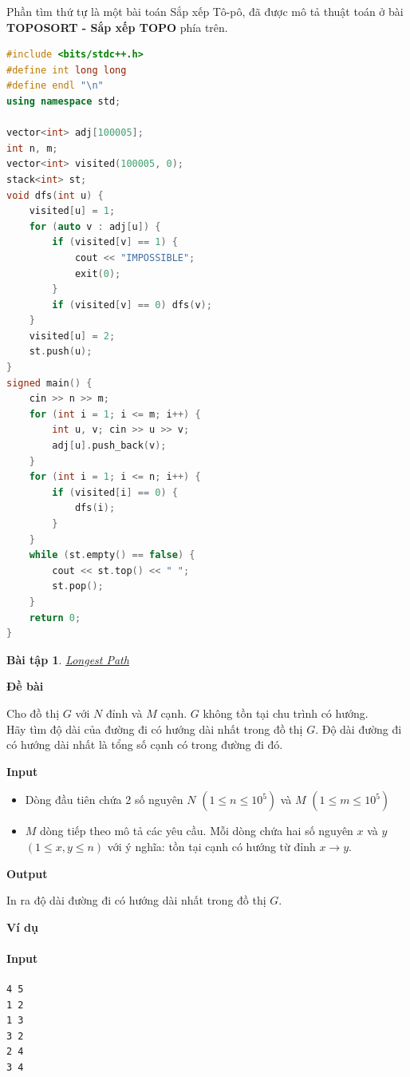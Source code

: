 \documentclass{article}
\newtheorem{baitap}{Bài tập}
\begin{document}
Phần tìm thứ tự là một bài toán Sắp xếp Tô-pô, đã được mô tả thuật toán ở bài \textbf{TOPOSORT - Sắp xếp TOPO} phía trên.

\begin{lstlisting}[language=C++, caption={Cài đặt}, label={code:CourseSchedule}]
#include <bits/stdc++.h>
#define int long long
#define endl "\n"
using namespace std;

vector<int> adj[100005];
int n, m; 
vector<int> visited(100005, 0);
stack<int> st;
void dfs(int u) {
    visited[u] = 1;
    for (auto v : adj[u]) {
        if (visited[v] == 1) {
            cout << "IMPOSSIBLE";
            exit(0);
        }
        if (visited[v] == 0) dfs(v);
    }
    visited[u] = 2;
    st.push(u);
}
signed main() {
    cin >> n >> m;
    for (int i = 1; i <= m; i++) {
        int u, v; cin >> u >> v;
        adj[u].push_back(v);
    }    
    for (int i = 1; i <= n; i++) {
        if (visited[i] == 0) {
            dfs(i);
        }
    }
    while (st.empty() == false) {
        cout << st.top() << " ";
        st.pop();
    }
    return 0;
}
\end{lstlisting}


\begin{baitap}
    \href{https://atcoder.jp/contests/dp/tasks/dp_g}{Longest Path}
\end{baitap}

\textbf{Đề bài}

Cho đồ thị $G$ với $N$ đỉnh và $M$ cạnh. $G$ không tồn tại chu trình có hướng. \\

Hãy tìm độ dài của đường đi có hướng dài nhất trong đồ thị $G$. Độ dài đường đi có hướng dài nhất là tổng số cạnh có trong đường đi đó.

\textbf{Input}

\begin{itemize}
    \item Dòng đầu tiên chứa 2 số nguyên $N$ $(1 \leq n \leq 10^5)$ và $M$ $(1 \leq m \leq 10^5)$
    \item $M$ dòng tiếp theo mô tả các yêu cầu. Mỗi dòng chứa hai số nguyên $x$ và $y$ $(1 \leq x, y \leq n)$ với ý nghĩa: tồn tại cạnh có hướng từ đỉnh $x \rightarrow y$.
\end{itemize}

\textbf{Output}

In ra độ dài đường đi có hướng dài nhất trong đồ thị $G$.

\textbf{Ví dụ}
\paragraph{Input}
\begin{lstlisting}
4 5
1 2
1 3
3 2
2 4
3 4
\end{lstlisting}
\end{document}
